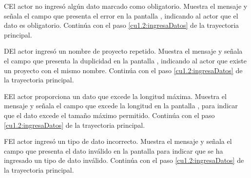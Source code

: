  \begin{UCtrayectoriaA}{C}{El actor no ingresó algún dato marcado como obligatorio.}
    \UCpaso[\UCsist] Muestra el mensaje  y señala el campo que presenta el error en la pantalla 
	    , indicando al actor que el dato es obligatorio.
    \UCpaso[] Continúa con el paso \ref{cu1.2:ingresaDatos} de la trayectoria principal.
 \end{UCtrayectoriaA}
 \begin{UCtrayectoriaA}{D}{El actor ingresó un nombre de proyecto repetido.}
    \UCpaso[\UCsist] Muestra el mensaje  y señala el campo que presenta la duplicidad en la pantalla 
	    , indicando al actor que existe un proyecto con el mismo nombre.
    \UCpaso[] Continúa con el paso \ref{cu1.2:ingresaDatos} de la trayectoria principal.
 \end{UCtrayectoriaA}
 
 \begin{UCtrayectoriaA}{E}{El actor proporciona un dato que excede la longitud máxima.}
    \UCpaso[\UCsist] Muestra el mensaje  y señala el campo que excede la 
    longitud en la pantalla , para indicar que el dato excede el tamaño máximo permitido.
    \UCpaso[] Continúa con el paso \ref{cu1.2:ingresaDatos} de la trayectoria principal.
 \end{UCtrayectoriaA}
 
 \begin{UCtrayectoriaA}{F}{El actor ingresó un tipo de dato incorrecto.}
    \UCpaso[\UCsist] Muestra el mensaje  y señala el campo que presenta el dato inválido en la 
    pantalla  para indicar que se ha ingresado un tipo de dato inválido.
    \UCpaso[] Continúa con el paso \ref{cu1.2:ingresaDatos} de la trayectoria principal.
 \end{UCtrayectoriaA}
